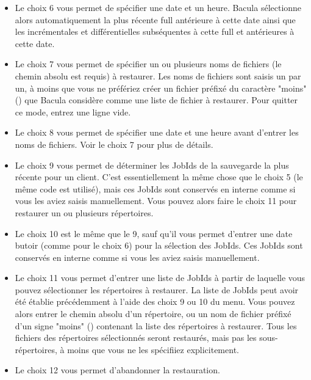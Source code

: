 \begin{itemize}
   Si tous les enregistrements de fichiers ont \'et\'e \'elagu\'es, Bacula constatera 
   qu'il n'y a aucune r\'ef\'erence \`a aucun fichier pour le JobIds s\'electionn\'es 
   et vous en informera, et vous proposera de faire une restauration compl\`ete 
   (non s\'elective) de ces JobIds. Ceci est possible car Bacula sait encore 
   o\`u commencent les donn\'ees sur les volumes, m\^eme s'il ne sait plus o\`u sont 
   les fichiers individuellement.
   
\item Le choix 6 vous permet de sp\'ecifier une date et un heure. Bacula 
   s\'electionne alors automatiquement la plus r\'ecente full ant\'erieure \`a cette date 
   ainsi que les incr\'ementales et diff\'erentielles subs\'equentes \`a cette full et 
   ant\'erieures \`a cette date.

\item Le choix 7 vous permet de sp\'ecifier un ou plusieurs noms de fichiers 
   (le chemin absolu est requis) \`a restaurer. Les noms de fichiers sont saisis 
   un par un, \`a moins que vous ne pr\'ef\'eriez cr\'eer un fichier pr\'efix\'e du 
   caract\`ere "moins" (\lt{}) que Bacula consid\`ere comme une liste de fichier 
   \`a restaurer. Pour quitter ce mode, entrez une ligne vide.

\item Le choix 8 vous permet de sp\'ecifier une date et une heure avant 
   d'entrer les noms de fichiers. Voir le choix 7 pour plus de d\'etails.

\item Le choix 9 vous permet de d\'eterminer les JobIds de la sauvegarde 
   la plus r\'ecente pour un client. C'est essentiellement la m\^eme chose 
   que le choix 5 (le m\^eme code est utilis\'e), mais ces JobIds sont 
   conserv\'es en interne comme si vous les aviez saisis manuellement. 
   Vous pouvez alors faire le choix 11 pour restaurer un ou plusieurs 
   r\'epertoires.
   
\item Le choix 10 est le m\^eme que le 9, sauf qu'il vous permet d'entrer 
   une date butoir (comme pour le choix 6) pour la s\'election des JobIds. 
   Ces JobIds sont conserv\'es en interne comme si vous les aviez saisis manuellement.
   
\item Le choix 11 vous permet d'entrer une liste de JobIds \`a partir de 
   laquelle vous pouvez s\'electionner les r\'epertoires \`a restaurer. La liste de 
   JobIds peut avoir \'et\'e \'etablie pr\'ec\'edemment \`a l'aide des choix 9 ou 10 
   du menu. Vous pouvez alors entrer le chemin absolu d'un r\'epertoire, ou 
   un nom de fichier pr\'efix\'e d'un signe "moins" (\lt{}) contenant la liste 
   des r\'epertoires \`a restaurer. Tous les fichiers des r\'epertoires s\'electionn\'es 
   seront restaur\'es, mais pas les sous-r\'epertoires, \`a moins que vous ne les 
   sp\'ecifiiez explicitement. 
   
\item  Le choix 12 vous permet d'abandonner la restauration.
\end{itemize}

